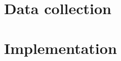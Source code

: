 \documentclass[a4paper, 11pt, oneside]{Thesis}  %
\begin{document}
\frontmatter      %






% 

% 













% 

% 

% 



\mainmatter	  %
\pagestyle{fancy}  %






\part{Data collection}


\part{Implementation}


\end{document}
